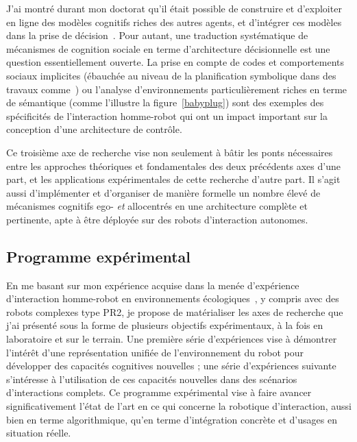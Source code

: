 \documentclass[a4paper]{article}
\begin{document}
J'ai montré
durant mon doctorat qu'il était possible de construire et d'exploiter en ligne
des modèles cognitifs riches des autres agents, et d'intégrer ces modèles dans
la prise de décision~\cite{alami2011when, warnier2012when, lemaignan2014human}.
Pour autant, une traduction systématique de mécanismes de cognition sociale en
terme d'architecture décisionnelle est une question essentiellement ouverte. La
prise en compte de codes et comportements sociaux implicites (ébauchée au niveau
de la planification symbolique dans des travaux comme~\cite{Alili2009}) ou
l'analyse d'environnements particulièrement riches en terme de sémantique (comme
l'illustre la figure~\ref{babyplug}) sont des exemples des spécificités de
l'interaction homme-robot qui ont un impact important sur la conception d'une
architecture de contrôle.

Ce troisième axe de recherche vise non seulement à bâtir les ponts nécessaires
entre les approches théoriques et fondamentales des deux précédents axes d'une
part, et les applications expérimentales de cette recherche d'autre part. Il
s'agit aussi d'implémenter et d'organiser de manière formelle un nombre élevé de
mécanismes cognitifs ego- \emph{et} allocentrés en une architecture complète et pertinente, apte à être
déployée sur des robots d'interaction autonomes.

\subsection*{Programme expérimental}

En me basant sur mon expérience acquise dans la menée d'expérience d'interaction
homme-robot en environnements écologiques~\cite{lemaignan2010oro,ros2010which,lallee2011towards,lemaignan2012roboscopie,warnier2012when,hood2015when}, y compris avec des robots
complexes type PR2,
je propose de matérialiser les axes de recherche que j'ai présenté sous la forme de
plusieurs objectifs expérimentaux, à la fois en laboratoire et sur le terrain.
Une première série d'expériences vise à démontrer l'intérêt d'une représentation
unifiée de l'environnement du robot pour développer des capacités cognitives
nouvelles ; une série d'expériences suivante s'intéresse à l'utilisation de ces
capacités nouvelles dans des scénarios d'interactions complets.  Ce
programme expérimental vise à faire avancer significativement l'état de l'art en
ce qui concerne la robotique d'interaction, aussi bien en terme algorithmique,
qu'en terme d'intégration concrète et d'usages en situation réelle.
\end{document}
